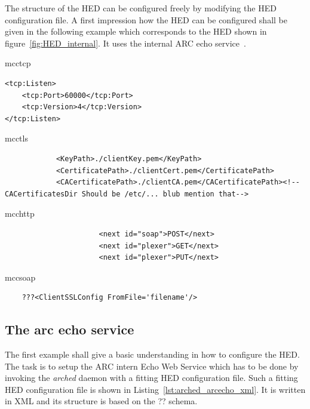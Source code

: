 The structure of the HED can be configured freely by modifying the HED configuration file. A first impression how the HED can be configured shall be given in the following example which corresponds to the HED shown in figure~\ref{fig:HED_internal}. It uses the internal ARC echo service~\cite{QIANG_2005}.

    mcctcp\\
\begin{verbatim}
<tcp:Listen>
	<tcp:Port>60000</tcp:Port>
	<tcp:Version>4</tcp:Version>
</tcp:Listen>
\end{verbatim}
    mcctls\\
\begin{verbatim}
 			<KeyPath>./clientKey.pem</KeyPath>
			<CertificatePath>./clientCert.pem</CertificatePath>
			<CACertificatePath>./clientCA.pem</CACertificatePath><!-- CACertificatesDir Should be /etc/... blub mention that-->

\end{verbatim}

    mcchttp\\
\begin{verbatim}
                      <next id="soap">POST</next>
                      <next id="plexer">GET</next>
                      <next id="plexer">PUT</next>
\end{verbatim}
    mccsoap\\
\begin{verbatim}
	???<ClientSSLConfig FromFile='filename'/>  
\end{verbatim}





\subsection{The arc echo service}

The first example shall give a basic understanding in how to configure the HED. The task is to setup the ARC intern Echo Web Service which has to be done by invoking the \textit{arched} daemon with a fitting HED configuration file. Such a fitting HED configuration file is shown in Listing~\ref{lst:arched_arcecho_xml}. It is written in XML and its structure is based on the \textcolor{urgent}{??} schema.
\\

